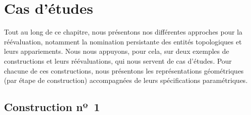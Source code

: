 \section{Cas d'études}
\label{sec:reevaluation-base-regles-cas-etude}


Tout au long de ce chapitre, nous présentons nos différentes approches pour la
réévaluation, notamment la nomination persistante des entités topologiques et
leurs appariements. Nous nous appuyons, pour cela, sur deux exemples de constructions et leurs réévaluations, qui
nous servent de cas d'études. %
Pour chacune de ces constructions, nous présentons les représentations
géométriques (par étape de construction) accompagnées de leurs spécifications
paramétriques. %

\subsection{Construction nº~1}
\label{sec:reevaluation-base-regles-premier-cas}

